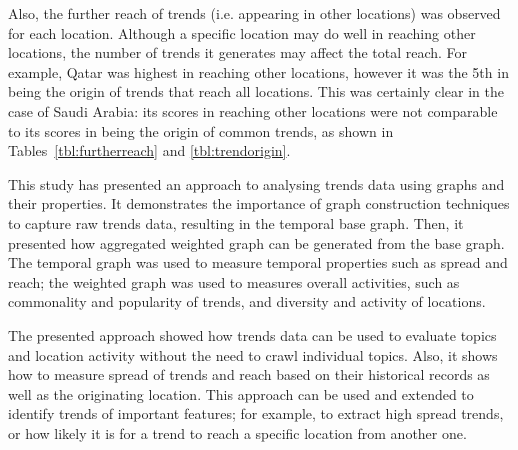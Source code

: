 \documentclass{llncs}
\begin{document}
Also, the further reach of trends (i.e. appearing in other locations)
was observed for each location. Although a specific location may do
well in reaching other locations, the number of trends it generates may
affect the total reach. For example, Qatar was highest in reaching
other locations, however it was the 5th in being the origin of trends
that reach all locations. This was certainly clear in the case of Saudi
Arabia: its scores in reaching other locations were not comparable to its
scores in being the origin of common trends, as shown in
Tables~\ref{tbl:furtherreach} and \ref{tbl:trendorigin}.

This study has presented an approach to analysing trends
data using graphs and their properties. It demonstrates the importance
of graph construction techniques to capture raw trends data, resulting
in the temporal base graph. Then, it presented how aggregated weighted
graph can be generated from the base graph. The temporal graph was
used to measure temporal properties such as spread and reach; the
weighted graph was used to measures overall activities, such as
commonality and popularity of trends, and diversity and activity of
locations.

The presented approach showed how trends data can be used to evaluate
topics and location activity without the need to crawl individual
topics. Also, it shows how to measure spread of trends and reach based
on their historical records as well as the originating location. This
approach can be used and extended to identify trends of important
features; for example, to extract high spread trends, or how likely it
is for a trend to reach a specific location from another one.






\end{document}
